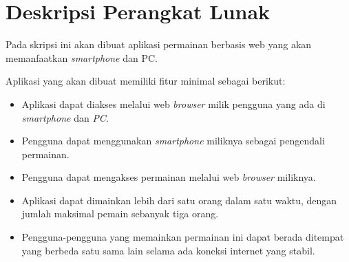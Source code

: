 \documentclass[a4paper,twoside]{article}
\begin{document}
\section{Deskripsi Perangkat Lunak}

		
Pada skripsi ini akan dibuat aplikasi permainan berbasis web yang akan memanfaatkan \textit{smartphone} dan PC.

Aplikasi yang akan dibuat memiliki fitur minimal sebagai berikut:
\begin{itemize}
	\item Aplikasi dapat diakses melalui web \textit{browser} milik pengguna yang ada di \textit{smartphone} dan \textit{PC}.
	\item Pengguna dapat menggunakan \textit{smartphone} miliknya sebagai pengendali permainan.
	\item  Pengguna dapat mengakses permainan melalui web \textit{browser} miliknya.
	\item Aplikasi dapat dimainkan lebih dari satu orang dalam satu waktu, dengan jumlah maksimal pemain sebanyak tiga orang.
	\item Pengguna-pengguna yang memainkan permainan ini dapat berada ditempat yang berbeda satu sama lain selama ada koneksi internet yang stabil. 
\end{itemize}
\end{document}
